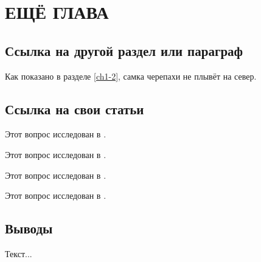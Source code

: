 \chapter{ЕЩЁ ГЛАВА} \label{chapter:4}



\section[Ссылка на другой раздел или параграф]{Ссылка на другой раздел или параграф}



Как показано в разделе \ref{ch1-2}, самка черепахи не плывёт на север.


\section[Ссылка на свои статьи]{Ссылка на свои статьи}

Этот вопрос исследован в \cite{myarticle1}.

Этот вопрос исследован в \cite{myarticle2, myarticle3}.

Этот вопрос исследован в \cite{myarticle4, myarticle5}.

Этот вопрос исследован в \cite{myarticle6}.


\section*{Выводы}

Текст...